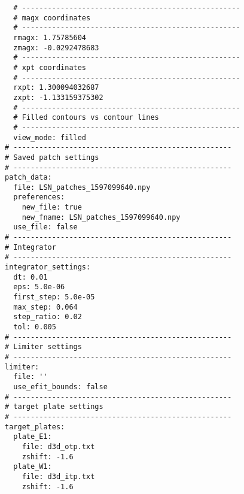 \begin{lstlisting}
  # ---------------------------------------------------
  # magx coordinates
  # ---------------------------------------------------
  rmagx: 1.75785604
  zmagx: -0.0292478683
  # ---------------------------------------------------
  # xpt coordinates
  # ---------------------------------------------------
  rxpt: 1.300094032687
  zxpt: -1.133159375302
  # ---------------------------------------------------
  # Filled contours vs contour lines
  # ---------------------------------------------------
  view_mode: filled
# ---------------------------------------------------
# Saved patch settings
# ---------------------------------------------------
patch_data:
  file: LSN_patches_1597099640.npy
  preferences:
    new_file: true
    new_fname: LSN_patches_1597099640.npy
  use_file: false
# ---------------------------------------------------
# Integrator
# ---------------------------------------------------
integrator_settings:
  dt: 0.01
  eps: 5.0e-06
  first_step: 5.0e-05
  max_step: 0.064
  step_ratio: 0.02
  tol: 0.005
# ---------------------------------------------------
# Limiter settings
# ---------------------------------------------------
limiter:
  file: ''
  use_efit_bounds: false
# ---------------------------------------------------
# target plate settings
# ---------------------------------------------------
target_plates:
  plate_E1:
    file: d3d_otp.txt
    zshift: -1.6
  plate_W1:
    file: d3d_itp.txt
    zshift: -1.6
\end{lstlisting}